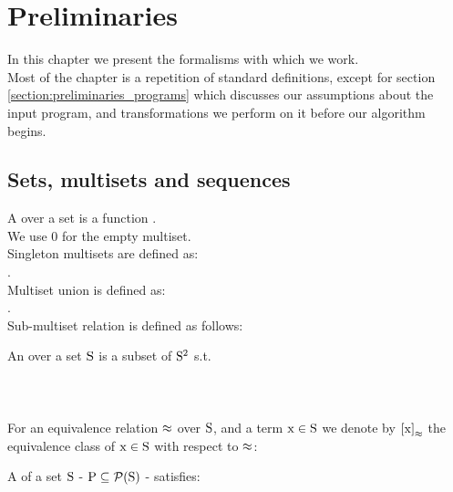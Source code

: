 \chapter{Preliminaries}\label{chapter:preliminaries}
In this chapter we present the formalisms with which we work.\\
Most of the chapter is a repetition of standard definitions, except for section \ref{section:preliminaries_programs} which discusses our assumptions about the input program, and transformations we perform on it before our algorithm begins.

\section*{Sets, multisets and sequences}
A   over a set  is a function .\\
We use 0 for the empty multiset.\\
Singleton multisets are defined as:\\
 .\\
Multiset union is defined as:\\
 .\\
Sub-multiset relation is defined as follows:\\

\noindent
An  \m{\approx} over a set $\mathrm{S}$ is a subset of $\mathrm{S^2}$ s.t.\\
\\
\\
\\
For an equivalence relation $\mathrm{\approx}$ over $\mathrm{S}$, and a term $\mathrm{x \in S}$ we denote by 
$\mathrm{\left[\mathrm{x}\right]_{\mathrm{\approx}}}$ the equivalence class of $\mathrm{x \in S}$ with respect to $\mathrm{\approx}$:\\

\noindent
A  of a set $\mathrm{S}$ - $\mathrm{P \subseteq \mathrm{\mathcal{P}(S)} }$ - satisfies:\\
\\

